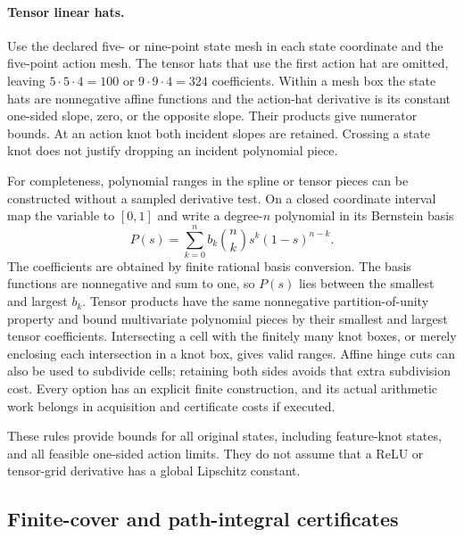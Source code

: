 \paragraph{Tensor linear hats.}
Use the declared five- or nine-point state mesh in each
state coordinate and the five-point action mesh.
The tensor hats that use the first action hat are omitted,
leaving \(5\cdot5\cdot4=100\) or
\(9\cdot9\cdot4=324\) coefficients.
Within a mesh box the state hats are nonnegative affine
functions and the action-hat derivative is its constant
one-sided slope, zero, or the opposite slope.
Their products give numerator bounds.
At an action knot both incident slopes are retained.
Crossing a state knot does not justify dropping an
incident polynomial piece.

For completeness, polynomial ranges in the spline or
tensor pieces can be constructed without a sampled
derivative test.  On a closed coordinate interval map
the variable to \([0,1]\) and write a degree-\(n\)
polynomial in its Bernstein basis
\[
 P(s)=\sum_{k=0}^n b_k{n\choose k}s^k(1-s)^{n-k}.
\]
The coefficients are obtained by finite rational basis
conversion.  The basis functions are nonnegative and
sum to one, so \(P(s)\) lies between the smallest and
largest \(b_k\).  Tensor products have the same
nonnegative partition-of-unity property and bound
multivariate polynomial pieces by their smallest and
largest tensor coefficients.  Intersecting a cell with
the finitely many knot boxes, or merely enclosing each
intersection in a knot box, gives valid ranges.
Affine hinge cuts can also be used to subdivide cells;
retaining both sides avoids that extra subdivision
cost.  Every option has an explicit finite construction,
and its actual arithmetic work belongs in acquisition
and certificate costs if executed.

These rules provide bounds for all original states,
including feature-knot states, and all feasible
one-sided action limits.  They do not assume that a
ReLU or tensor-grid derivative has a global Lipschitz
constant.

\subsection{Finite-cover and path-integral certificates}

